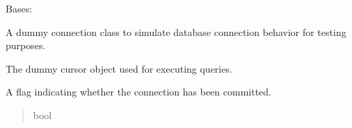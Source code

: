 \documentclass[letterpaper,10pt,english]{sphinxmanual}
\begin{document}
\begin{fulllineitems}
\label{\detokenize{test.data_storage:test.data_storage.test_create_table.DummyConnection}}
\pysigstartsignatures
\pysigline
{}
\pysigstopsignatures
\sphinxAtStartPar
Bases: 

\sphinxAtStartPar
A dummy connection class to simulate database connection behavior for testing purposes.

\begin{fulllineitems}
\label{\detokenize{test.data_storage:test.data_storage.test_create_table.DummyConnection.cursor_obj}}
\pysigstartsignatures
\pysigline
{}
\pysigstopsignatures
\sphinxAtStartPar
The dummy cursor object used for executing queries.
\begin{quote}\begin{description}
\sphinxAtStartPar
{\hyperref[\detokenize{test.data_storage:test.data_storage.test_create_table.DummyCursor}]{}}

\end{description}\end{quote}

\end{fulllineitems}


\begin{fulllineitems}
\label{\detokenize{test.data_storage:test.data_storage.test_create_table.DummyConnection.committed}}
\pysigstartsignatures
\pysigline
{}
\pysigstopsignatures
\sphinxAtStartPar
A flag indicating whether the connection has been committed.
\begin{quote}\begin{description}
\sphinxAtStartPar
bool

\end{description}\end{quote}


\end{fulllineitems}
\end{fulllineitems}
\end{document}
